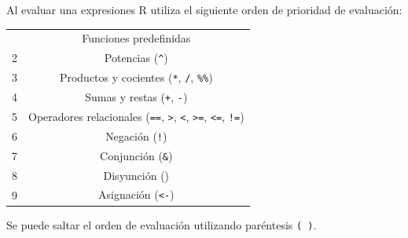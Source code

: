 \documentclass[
  a4paper,
]{scrreport}
\theoremstyle{definition}
\theoremstyle{definition}
\theoremstyle{remark}
\begin{document}
Al evaluar una expresiones R utiliza el siguiente orden de prioridad de
evaluación:

\begin{longtable}[]{@{}cc@{}}
\toprule\noalign{}
\endhead
\bottomrule\noalign{}
\endlastfoot
1 & Funciones predefinidas \\
2 & Potencias (\texttt{\^{}}) \\
3 & Productos y cocientes (\texttt{*}, \texttt{/}, \texttt{\%\%}) \\
4 & Sumas y restas (\texttt{+}, \texttt{-}) \\
5 & Operadores relacionales (\texttt{==}, \texttt{\textgreater{}},
\texttt{\textless{}}, \texttt{\textgreater{}=}, \texttt{\textless{}=},
\texttt{!=}) \\
6 & Negación (\texttt{!}) \\
7 & Conjunción (\texttt{\&}) \\
8 & Disyunción (\texttt{\textbar{}}) \\
9 & Asignación (\texttt{\textless{}-}) \\
\end{longtable}

Se puede saltar el orden de evaluación utilizando paréntesis
\texttt{(\ )}.
\end{document}
